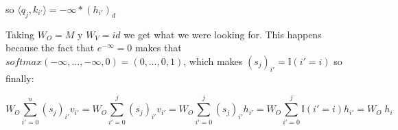 so $\langle q_{j}, k_{i'} \rangle = -\infty *(h_{i'})_{d}$

\bigskip

Taking $W_O = M$ y $W_V = id$ we get what we were looking for. This happens because the fact that $e^{-\infty} = 0$ makes that $softmax(-\infty, \dots, -\infty, 0) = (0, \dots, 0, 1)$, which makes $(s_j)_{i'} = \mathbb{I}(i' = i)$ so finally:

\[
  W_O \sum_{i'=0}^{n} (s_j)_{i'} v_{i'} = 
  W_O \sum_{i'=0}^{j} (s_j)_{i'} v_{i'} = 
  W_O \sum_{i'=0}^{j} (s_j)_{i'} h_{i'} = 
  W_O \sum_{i'=0}^{j} \mathbb{I}(i' = i) h_{i'} = 
  W_O \; h_i
\]
















